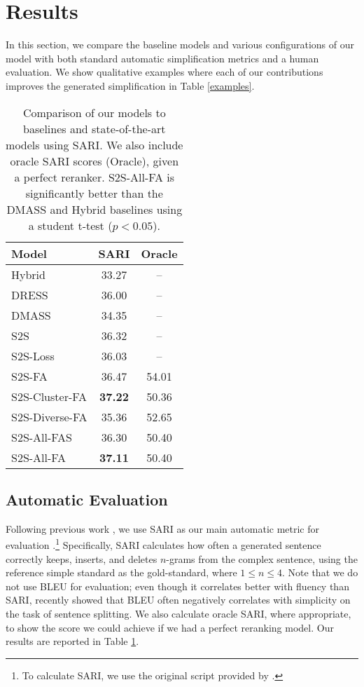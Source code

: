 \documentclass[11pt,a4paper]{article}
\begin{document}
\section{Results} \label{results}

In this section, we compare the baseline models and various configurations of our model with both standard automatic simplification metrics and a human evaluation. We show qualitative examples where each of our contributions improves the generated simplification in Table \ref{examples}.

\begin{table}
\begin{center}
\begin{tabular}{|l|c|c|} \hline
\textbf{Model} & \textbf{SARI} & \textbf{Oracle} \\ \hline
Hybrid & 33.27 & -- \\
DRESS & 36.00 & -- \\
DMASS & 34.35 & -- \\ \hline
S2S & 36.32 & -- \\
S2S-Loss & 36.03 & -- \\
S2S-FA & 36.47 & 54.01 \\
S2S-Cluster-FA & \textbf{37.22} &  50.36 \\
S2S-Diverse-FA & 35.36 & 52.65 \\
S2S-All-FAS & 36.30 & 50.40 \\
S2S-All-FA & \textbf{37.11} & 50.40 \\ \hline
\end{tabular}
\end{center}
\caption{\label{sari} Comparison of our models to baselines and state-of-the-art models using SARI. We also include oracle SARI scores (Oracle), given a perfect reranker. S2S-All-FA is significantly better than the DMASS and Hybrid baselines using a student t-test ($p < 0.05$).}
\end{table}

\subsection{Automatic Evaluation}

Following previous work \cite{zhang2017sentence,zhao2018integrating}, we use SARI as our main automatic metric for evaluation \cite{xu2016optimizing}.\footnote{To calculate SARI, we use the original script provided by \cite{xu2016optimizing}.} Specifically, SARI calculates how often a generated sentence correctly keeps, inserts, and deletes $n$-grams from the complex sentence, using the reference simple standard as the gold-standard, where $1 \leq n \leq 4$. Note that we do not use BLEU \cite{papineni2002bleu} for evaluation; even though it correlates better with fluency than SARI,  recently showed that BLEU often negatively correlates with simplicity on the task of sentence splitting. We also calculate oracle SARI, where appropriate, to show the score we could achieve if we had a perfect reranking model. Our results are reported in Table \ref{sari}.
\end{document}
